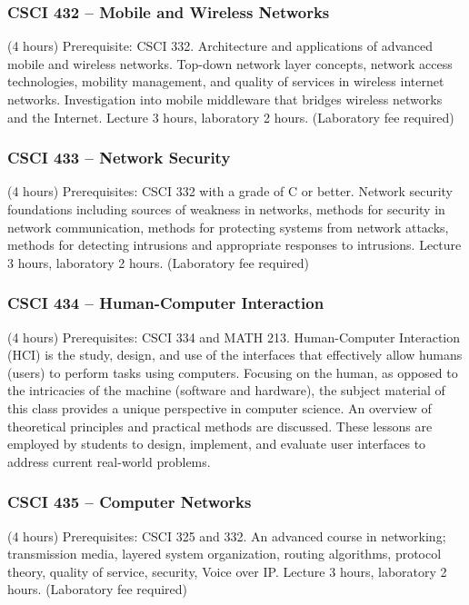 \subsubsection{CSCI 432 -- Mobile and Wireless Networks}
(4 hours) Prerequisite: CSCI 332. Architecture and applications of advanced mobile and wireless networks. Top-down network layer concepts, network access technologies, mobility management, and quality of services in wireless internet networks. Investigation into mobile middleware that bridges wireless networks and the Internet. Lecture 3 hours, laboratory 2 hours. (Laboratory fee required)

\subsubsection{CSCI 433 -- Network Security}
(4 hours) Prerequisites: CSCI 332 with a grade of C or better. Network security foundations including sources of weakness in networks, methods for security in network communication, methods for protecting systems from network attacks, methods for detecting intrusions and appropriate responses to intrusions. Lecture 3 hours, laboratory 2 hours. (Laboratory fee required)

\subsubsection{CSCI 434 -- Human-Computer Interaction}
(4 hours) Prerequisites: CSCI 334 and MATH 213. Human-Computer Interaction (HCI) is the study, design, and use of the interfaces that effectively allow humans (users) to perform tasks using computers. Focusing on the human, as opposed to the intricacies of the machine (software and hardware), the subject material of this class provides a unique perspective in computer science. An overview of theoretical principles and practical methods are discussed. These lessons are employed by students to design, implement, and evaluate user interfaces to address current real-world problems.

\subsubsection{CSCI 435 -- Computer Networks}
(4 hours) Prerequisites: CSCI 325 and 332. An advanced course in networking; transmission media, layered system organization, routing algorithms, protocol theory, quality of service, security, Voice over IP. Lecture 3 hours, laboratory 2 hours. (Laboratory fee required)

